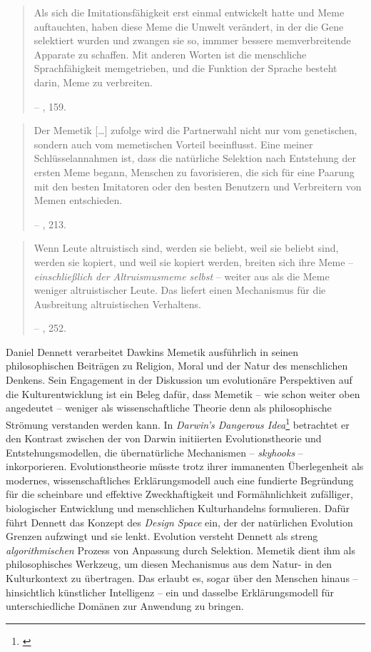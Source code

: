 \documentclass[openany,twoside,twocolumn]{book}
\let\rmarkdownfootnote\footnote%
\def\footnote{\protect\rmarkdownfootnote}
\begin{document}
\begin{quote}
Als sich die Imitationsfähigkeit erst einmal entwickelt hatte und Meme
auftauchten, haben diese Meme die Umwelt verändert, in der die Gene
selektiert wurden und zwangen sie so, immmer bessere memverbreitende
Apparate zu schaffen. Mit anderen Worten ist die menschliche
Sprachfähigkeit memgetrieben, und die Funktion der Sprache besteht
darin, Meme zu verbreiten.

-- \textcite{blackmore_macht_2000}, 159.
\end{quote}

\begin{quote}
Der Memetik {[}\ldots{}{]} zufolge wird die Partnerwahl nicht nur vom
genetischen, sondern auch vom memetischen Vorteil beeinflusst. Eine
meiner Schlüsselannahmen ist, dass die natürliche Selektion nach
Entstehung der ersten Meme begann, Menschen zu favorisieren, die sich
für eine Paarung mit den besten Imitatoren oder den besten Benutzern und
Verbreitern von Memen entschieden.

-- \textcite{blackmore_macht_2000}, 213.
\end{quote}

\begin{quote}
Wenn Leute altruistisch sind, werden sie beliebt, weil sie beliebt sind,
werden sie kopiert, und weil sie kopiert werden, breiten sich ihre Meme
-- \emph{einschließlich der Altruismusmeme selbst} -- weiter aus als die
Meme weniger altruistischer Leute. Das liefert einen Mechanismus für die
Ausbreitung altruistischen Verhaltens.

-- \textcite{blackmore_macht_2000}, 252.
\end{quote}

Daniel Dennett verarbeitet Dawkins Memetik ausführlich in seinen
philosophischen Beiträgen zu Religion, Moral und der Natur des
menschlichen Denkens. Sein Engagement in der Diskussion um evolutionäre
Perspektiven auf die Kulturentwicklung ist ein Beleg dafür, dass Memetik
-- wie schon weiter oben angedeutet -- weniger als wissenschaftliche
Theorie denn als philosophische Strömung verstanden werden kann. In
\emph{Darwin's Dangerous Idea}\footnote{\textcite{dennett_darwins_1995}}
betrachtet er den Kontrast zwischen der von Darwin initiierten
Evolutionstheorie und Entstehungsmodellen, die übernatürliche
Mechanismen -- \emph{skyhooks} -- inkorporieren. Evolutionstheorie
müsste trotz ihrer immanenten Überlegenheit als modernes,
wissenschaftliches Erklärungsmodell auch eine fundierte Begründung für
die scheinbare und effektive Zweckhaftigkeit und Formähnlichkeit
zufälliger, biologischer Entwicklung und menschlichen Kulturhandelns
formulieren. Dafür führt Dennett das Konzept des \emph{Design Space}
ein, der der natürlichen Evolution Grenzen aufzwingt und sie lenkt.
Evolution versteht Dennett als streng \emph{algorithmischen} Prozess von
Anpassung durch Selektion. Memetik dient ihm als philosophisches
Werkzeug, um diesen Mechanismus aus dem Natur- in den Kulturkontext zu
übertragen. Das erlaubt es, sogar über den Menschen hinaus --
hinsichtlich künstlicher Intelligenz -- ein und dasselbe
Erklärungsmodell für unterschiedliche Domänen zur Anwendung zu bringen.
\end{document}
